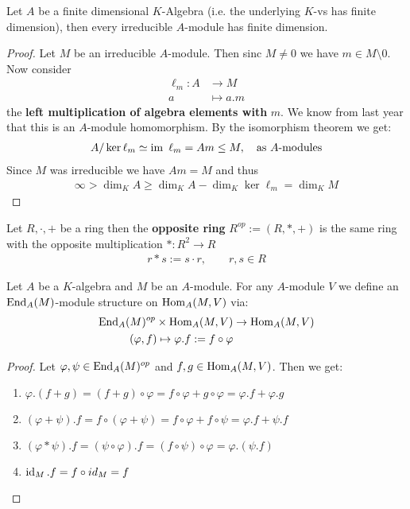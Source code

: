 \documentclass[]{article}
\begin{document}
\begin{remark}
    Let \(A\) be a finite dimensional \(K\)-Algebra (i.e. the underlying \(K\)-vs has finite dimension), then every irreducible
    \(A\)-module has finite dimension.
\end{remark}
\begin{proof}
    Let \(M\) be an irreducible \(A\)-module. Then sinc \(M \neq 0\) we have \(m \in M\setminus 0\). Now consider
    \begin{align*}
        \ell_m: A &\rightarrow M\\
            a&\mapsto a.m
    \end{align*}
    the \textbf{left multiplication of algebra elements with} \(m\). We know from last year that this is an \(A\)-module homomorphism.
    By the isomorphism theorem we get:
    \begin{align*}
        A / \ker \ell_m \simeq \operatorname{im} \ \ell_m =Am \leq M, \quad \text{as \(A\)-modules}
    \end{align*}
    Since \(M\) was irreducible we have \(Am = M\) and thus
    \begin{align*}
        \infty > \dim_K A \geq \dim_K A - \dim_K \ker \ell_m = \dim_K M
    \end{align*}
\end{proof}
\begin{definition*}
Let \(R,\cdot,+\) be a ring then the \textbf{opposite ring} \(R^{op}:=(R,*,+)\) is the same ring 
with the opposite multiplication \(*:R^2 \rightarrow R\)
\begin{align*}
    r * s := s \cdot r, \qquad r,s \in R
\end{align*}
\end{definition*}
\begin{theorem}
    Let \(A\) be a \(K\)-algebra and \(M\) be an \(A\)-module. For any \(A\)-module \(V\) we define an 
    \(\operatorname{End}_A(M)\)-module structure on \(\operatorname{Hom}_A(M,V)\) via:
    \begin{align*}
        \operatorname{End}_A(M)^{op} \times \operatorname{Hom}_A(M,V) &\rightarrow \operatorname{Hom}_A(M,V) \\
        ( \varphi, f) \mapsto \varphi.f := f \circ \varphi
    \end{align*}
\end{theorem}
\begin{proof}
    Let \(\varphi, \psi \in \operatorname{End}_A(M)^{op}\) and \(f,g \in \operatorname{Hom}_A(M,V)\). Then we get:
    \begin{enumerate}[label=\roman*)]
        \item \(\varphi.(f+g)=(f+g) \circ \varphi = f \circ \varphi + g \circ \varphi = \varphi .f+\varphi .g\)
        \item \((\varphi+\psi).f = f \circ (\varphi + \psi) = f \circ \varphi + f \circ \psi = \varphi.f+\psi.f\)
        \item \((\varphi * \psi).f=(\psi \circ \varphi).f = (f \circ \psi) \circ \varphi = \varphi.(\psi.f)\)
        \item \(\operatorname{id}_M.f=f \circ id_M = f\)
    \end{enumerate}
\end{proof}
\end{document}
